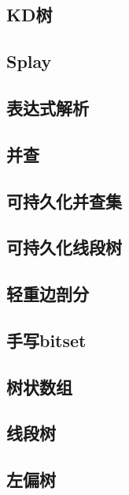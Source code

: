 \documentclass[UTF8]{ctexart}
\begin{document}
\subsection{KD树}

\subsection{Splay}

\subsection{表达式解析}

\subsection{并查}

\subsection{可持久化并查集}

\subsection{可持久化线段树}

\subsection{轻重边剖分}

\subsection{手写bitset}

\subsection{树状数组}

\subsection{线段树}

\subsection{左偏树}

\end{document}
